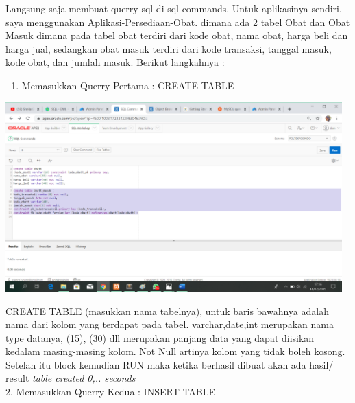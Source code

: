 \documentclass{article}
\begin{document}
Langsung saja membuat querry sql di sql commands. Untuk aplikasinya sendiri, saya menggunakan Aplikasi-Persediaan-Obat. dimana ada 2 tabel Obat dan Obat Masuk dimana pada tabel obat terdiri dari kode obat, nama obat, harga beli dan harga jual, sedangkan obat masuk terdiri dari kode transaksi, tanggal masuk, kode obat, dan jumlah masuk. Berikut langkahnya :

\begin{enumerate}
    \item Memasukkan Querry Pertama : CREATE TABLE 
\end{enumerate}

\begin{center}
    \includegraphics[width=13cm]{figure/tabelbaru2.png}
\end{center}

CREATE TABLE (masukkan nama tabelnya), untuk baris bawahnya adalah nama dari kolom yang terdapat pada tabel. varchar,date,int merupakan nama type datanya, (15), (30) dll merupakan panjang data yang dapat diisikan kedalam masing-masing kolom. Not Null artinya kolom yang tidak boleh kosong. Setelah itu block kemudian RUN maka ketika berhasil dibuat akan ada hasil/ result \textit{table created 0,.. seconds}\\


     2. Memasukkan Querry Kedua : INSERT TABLE\\
\end{document}
